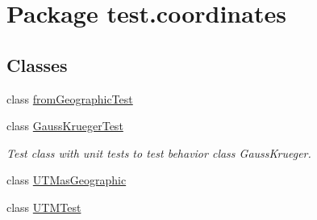 \hypertarget{namespacetest_1_1coordinates}{}\section{Package test.\+coordinates}
\label{namespacetest_1_1coordinates}
\subsection*{Classes}
\begin{DoxyCompactItemize}
\item 
class \hyperlink{classtest_1_1coordinates_1_1from_geographic_test}{from\+Geographic\+Test}
\item 
class \hyperlink{classtest_1_1coordinates_1_1_gauss_krueger_test}{Gauss\+Krueger\+Test}
\begin{DoxyCompactList}\small\item\em Test class with unit tests to test behavior class Gauss\+Krueger. \end{DoxyCompactList}\item 
class \hyperlink{classtest_1_1coordinates_1_1_u_t_mas_geographic}{U\+T\+Mas\+Geographic}
\item 
class \hyperlink{classtest_1_1coordinates_1_1_u_t_m_test}{U\+T\+M\+Test}
\end{DoxyCompactItemize}
